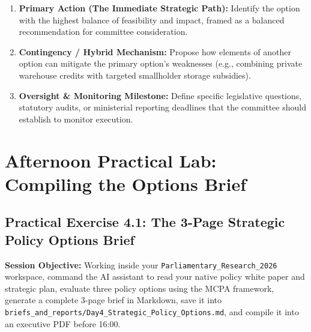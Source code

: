\documentclass[11pt, a4paper]{report}
\begin{document}
\begin{enumerate}[label=\textbf{\arabic*.}]
    \item \textbf{Primary Action (The Immediate Strategic Path):} Identify the option with the highest balance of feasibility and impact, framed as a balanced recommendation for committee consideration.
    \item \textbf{Contingency / Hybrid Mechanism:} Propose how elements of another option can mitigate the primary option's weaknesses (e.g., combining private warehouse credits with targeted smallholder storage subsidies).
    \item \textbf{Oversight \& Monitoring Milestone:} Define specific legislative questions, statutory audits, or ministerial reporting deadlines that the committee should establish to monitor execution.
\end{enumerate}

\vspace{1.5em}
\noindent{}
\vspace{1.5em}

\newpage

\chapter{Afternoon Practical Lab: Compiling the Options Brief}

\section{Practical Exercise 4.1: The 3-Page Strategic Policy Options Brief}
\textbf{Session Objective:} Working inside your \texttt{Parliamentary\_Research\_2026} workspace, command the AI assistant to read your native policy white paper and strategic plan, evaluate three policy options using the MCPA framework, generate a complete 3-page brief in Markdown, save it into \texttt{briefs\_and\_reports/Day4\_Strategic\_Policy\_Options.md}, and compile it into an executive PDF before 16:00.
\end{document}
